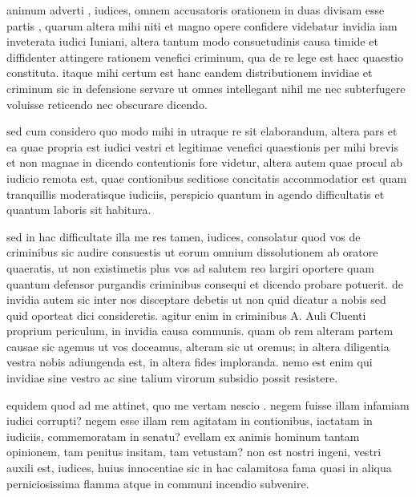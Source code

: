 
 animum adverti , iudices, omnem accusatoris orationem in duas divisam esse partis , quarum altera mihi niti et magno opere confidere videbatur invidia iam inveterata iudici Iuniani, altera tantum modo consuetudinis causa timide et diffidenter attingere rationem venefici criminum, qua de re lege est haec quaestio constituta. itaque mihi certum est hanc eandem distributionem invidiae et criminum sic in defensione servare ut omnes intellegant nihil me nec subterfugere voluisse reticendo nec obscurare dicendo.

 sed cum considero quo modo mihi in utraque re sit elaborandum, altera pars et ea quae propria est iudici vestri et legitimae venefici quaestionis per mihi brevis et non magnae in dicendo contentionis fore videtur, altera autem quae procul ab iudicio remota est, quae contionibus seditiose concitatis accommodatior est quam tranquillis moderatisque iudiciis, perspicio quantum in agendo difficultatis et quantum laboris sit habitura.

 sed in hac difficultate illa me res tamen, iudices, consolatur quod vos de criminibus sic audire consuestis ut eorum omnium dissolutionem ab oratore quaeratis, ut non existimetis plus vos ad salutem reo largiri oportere quam quantum defensor purgandis criminibus consequi et dicendo probare potuerit. de invidia autem sic inter nos disceptare debetis ut non quid dicatur a nobis sed quid oporteat dici consideretis. agitur enim in criminibus A. Auli Cluenti proprium periculum, in invidia causa communis. quam ob rem alteram partem causae sic agemus ut vos doceamus, alteram sic ut oremus; in altera diligentia vestra nobis adiungenda est, in altera fides imploranda. nemo est enim qui invidiae sine vestro ac sine talium virorum subsidio possit resistere.

 equidem quod ad me attinet, quo me vertam nescio . negem fuisse illam infamiam iudici corrupti? negem esse illam rem agitatam in contionibus, iactatam in iudiciis, commemoratam in senatu? evellam ex animis hominum tantam opinionem, tam penitus insitam, tam vetustam? non est nostri ingeni, vestri auxili est, iudices, huius innocentiae sic in hac calamitosa fama quasi in aliqua perniciosissima flamma atque in communi incendio subvenire.

